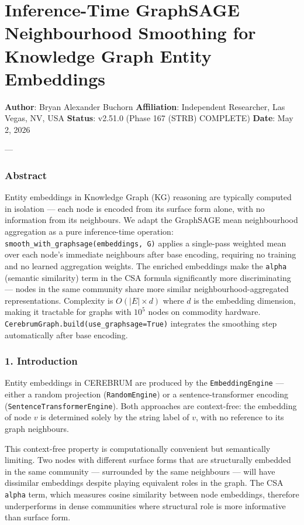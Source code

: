\section{Inference-Time GraphSAGE Neighb\-ourhood Smoothing for Knowledge Graph Entity Embeddings}

\textbf{Author}: Bryan Alexander Buchorn  
\textbf{Affiliation}: Independent Researcher, Las Vegas, NV, USA  
\textbf{Status}: v2.51.0 (Phase 167 (STRB) COMPLETE)
\textbf{Date}: May 2, 2026

---

\subsubsection{Abstract}
Entity embeddings in Knowledge Graph (KG) reasoning are typically computed in isolation — each node is encoded from its surface form alone, with no information from its neighbours. We adapt the GraphSAGE \cite{hamilton2017graphsage} mean neigh\-bourhood aggregation as a pure inference-time operation: \texttt{smooth\_with\_graphsage(embeddings, G)} applies a single-pass weighted mean over each node's immediate neighbours after base encoding, requiring no training and no learned aggregation weights. The enriched embeddings make the \texttt{alpha} (semantic similarity) term in the CSA formula \cite{vaswani2017attention} signi\-ficantly more discr\-iminating — nodes in the same community share more similar neigh\-bourhood-aggregated repre\-sentations. Complexity is $O(|E| \times d)$ where $d$ is the embedding dimension, making it tractable for graphs with $10^5$ nodes on commodity hardware. \texttt{CerebrumGraph.build(use\_graphsage=True)} integrates the smoothing step autom\-atically after base encoding.

\subsubsection{1. Introd\-uction}
Entity embeddings in CEREBRUM are produced by the \texttt{EmbeddingEngine} — either a random projection (\texttt{RandomEngine}) or a sentence-transformer encoding (\texttt{SentenceTransformerEngine}). Both approaches are context-free: the embedding of node $v$ is determined solely by the string label of $v$, with no reference to its graph neighbours.

This context-free property is compu\-tationally convenient but seman\-tically limiting. Two nodes with different surface forms that are struc\-turally embedded in the same community — surrounded by the same neighbours — will have dissimilar embeddings despite playing equivalent roles in the graph. The CSA \texttt{alpha} term, which measures cosine similarity between node embeddings, therefore under\-performs in dense communities where structural role is more informative than surface form.

